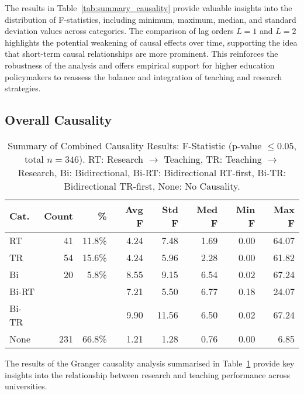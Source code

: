 \documentclass[a4paper, conference]{IEEEtran}
\begin{document}
The results in Table~\ref{tab:summary_causality} provide valuable insights into the distribution of F-statistics, including minimum, maximum, median, and standard deviation values across categories. The comparison of lag orders $L=1$ and $L=2$ highlights the potential weakening of causal effects over time, supporting the idea that short-term causal relationships are more prominent. This reinforces the robustness of the analysis and offers empirical support for higher education policymakers to reassess the balance and integration of teaching and research strategies.


\subsection{Overall Causality}
\begin{table}
	\centering
	\caption{Summary of Combined Causality Results: F-Statistic (p-value $\leq 0.05$, total $n=346$). RT: Research $\rightarrow$ Teaching, TR: Teaching $\rightarrow$ Research, Bi: Bidirectional, Bi-RT: Bidirectional RT-first, Bi-TR: Bidirectional TR-first, None: No Causality.}
	\label{tab:granger_overall}
	\begin{scriptsize}
	\begin{tabular}{|l|r|r|r|r|r|r|r|}
		\hline
		\textbf{Cat.} & \textbf{Count} & \textbf{\%} 
		& \textbf{Avg F} & \textbf{Std F} & \textbf{Med F} & \textbf{Min F} & \textbf{Max F} \\ \hline
		RT               & 41  & 11.8\% & 4.24  & 7.48  & 1.69  & 0.00  & 64.07 \\ \hline
		TR               & 54  & 15.6\% & 4.24  & 5.96  & 2.28  & 0.00  & 61.82 \\ \hline
		Bi               & 20  & 5.8\%  & 8.55  & 9.15  & 6.54  & 0.02  & 67.24 \\ \hline
		\hfill Bi-RT     &   &   & 7.21  & 5.50  & 6.77  & 0.18  & 24.07 \\ \hline
		\hfill Bi-TR     &   &   & 9.90  & 11.56 & 6.50  & 0.02  & 67.24 \\ \hline
		None             & 231 & 66.8\% & 1.21  & 1.28  & 0.76  & 0.00  & 6.85  \\ \hline
	\end{tabular}
\end{scriptsize}
\end{table}

The results of the Granger causality analysis summarised in Table~\ref{tab:granger_overall} provide key insights into the relationship between research and teaching performance across universities.
\end{document}
